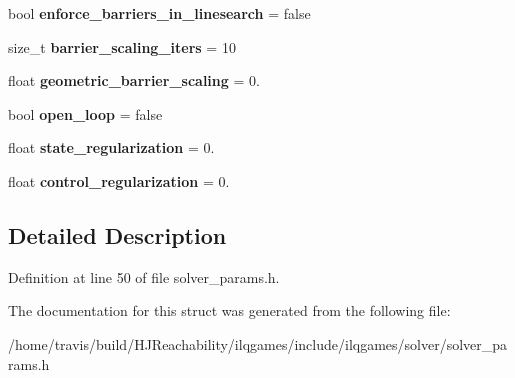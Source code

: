 \begin{DoxyCompactItemize}
\item 
bool {\bfseries enforce\+\_\+barriers\+\_\+in\+\_\+linesearch} = false\hypertarget{structilqgames_1_1_solver_params_a67cefbae8cac7cebf222e0188a0b6b05}{}\label{structilqgames_1_1_solver_params_a67cefbae8cac7cebf222e0188a0b6b05}

\item 
size\+\_\+t {\bfseries barrier\+\_\+scaling\+\_\+iters} = 10\hypertarget{structilqgames_1_1_solver_params_a0759cbca5370ac06afb2ed3b460ee233}{}\label{structilqgames_1_1_solver_params_a0759cbca5370ac06afb2ed3b460ee233}

\item 
float {\bfseries geometric\+\_\+barrier\+\_\+scaling} = 0.\hypertarget{structilqgames_1_1_solver_params_afe514e86e3439b0b041ce0fda74338bd}{}\label{structilqgames_1_1_solver_params_afe514e86e3439b0b041ce0fda74338bd}

\item 
bool {\bfseries open\+\_\+loop} = false\hypertarget{structilqgames_1_1_solver_params_abb3fe1fbe358304f0c80d75c104bc087}{}\label{structilqgames_1_1_solver_params_abb3fe1fbe358304f0c80d75c104bc087}

\item 
float {\bfseries state\+\_\+regularization} = 0.\hypertarget{structilqgames_1_1_solver_params_a1b78c2eb175f76f675f02bfe5f46e194}{}\label{structilqgames_1_1_solver_params_a1b78c2eb175f76f675f02bfe5f46e194}

\item 
float {\bfseries control\+\_\+regularization} = 0.\hypertarget{structilqgames_1_1_solver_params_a5a517a29fa35ce403cdcfa2e20b85d5c}{}\label{structilqgames_1_1_solver_params_a5a517a29fa35ce403cdcfa2e20b85d5c}

\end{DoxyCompactItemize}


\subsection{Detailed Description}


Definition at line 50 of file solver\+\_\+params.\+h.



The documentation for this struct was generated from the following file\+:\begin{DoxyCompactItemize}
\item 
/home/travis/build/\+H\+J\+Reachability/ilqgames/include/ilqgames/solver/solver\+\_\+params.\+h\end{DoxyCompactItemize}
